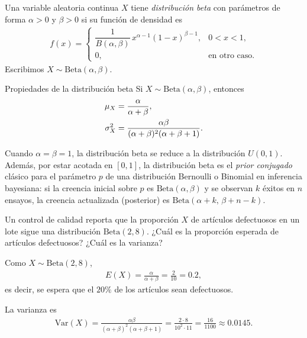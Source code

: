 \begin{definicion}
Una variable aleatoria continua $X$ tiene \emph{distribución beta} con parámetros de
forma $\alpha > 0$ y $\beta > 0$ si su función de densidad es
\begin{align}
 \label{eq:2.8.17}
 f(x) =
 \begin{cases}
  \dfrac{1}{B(\alpha,\beta)}\,x^{\alpha-1}(1-x)^{\beta-1}, & 0 < x < 1, \\
  0, & \text{en otro caso.}
 \end{cases}
\end{align}
Escribimos $X \sim \text{Beta}(\alpha,\beta)$.
\end{definicion}

{Propiedades de la distribución beta} Si $X \sim \text{Beta}(\alpha,\beta)$, entonces
\begin{align}
 \mu_X &= \frac{\alpha}{\alpha+\beta}, \\
 \sigma_X^2 &= \frac{\alpha\beta}{(\alpha+\beta)^2(\alpha+\beta+1)}.
\end{align}

\begin{observacion}
Cuando $\alpha=\beta=1$, la distribución beta se reduce a la distribución $U(0,1)$.
Además, por estar acotada en $[0,1]$, la distribución beta es el \emph{prior
conjugado} clásico para el parámetro $p$ de una distribución Bernoulli o Binomial
en inferencia bayesiana: si la creencia inicial sobre $p$ es $\text{Beta}(\alpha,\beta)$
y se observan $k$ éxitos en $n$ ensayos, la creencia actualizada (posterior) es
$\text{Beta}(\alpha+k,\, \beta+n-k)$.
\end{observacion}

\begin{ejemplo}
 \label{exmp:2.8.7}
Un control de calidad reporta que la proporción $X$ de artículos defectuosos en un
lote sigue una distribución $\text{Beta}(2,8)$. ¿Cuál es la proporción esperada de
artículos defectuosos? ¿Cuál es la varianza?
\end{ejemplo}

\begin{solucion}
Como $X \sim \text{Beta}(2,8)$,
\begin{align}
 E(X) = \frac{\alpha}{\alpha+\beta} = \frac{2}{10} = 0.2,
\end{align}
es decir, se espera que el $20\%$ de los artículos sean defectuosos.

La varianza es
\begin{align}
 \text{Var}(X) = \frac{\alpha\beta}{(\alpha+\beta)^2(\alpha+\beta+1)}
 = \frac{2\cdot 8}{10^2 \cdot 11} = \frac{16}{1100} \approx 0.0145.
\end{align}
\end{solucion}




